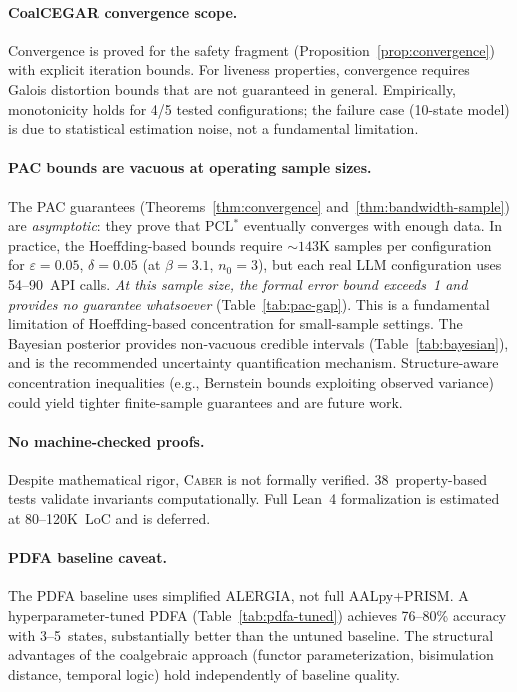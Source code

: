 \documentclass[11pt]{article}
\newcommand{\tool}{\textsc{Caber}}
\newcommand{\pclstar}{PCL$^*$}
\begin{document}
\paragraph{CoalCEGAR convergence scope.}
Convergence is proved for the safety fragment
(Proposition~\ref{prop:convergence}) with explicit iteration bounds.
For liveness properties, convergence requires Galois distortion
bounds that are not guaranteed in general.  Empirically, monotonicity
holds for 4/5 tested configurations; the failure case (10-state model)
is due to statistical estimation noise, not a fundamental limitation.

\paragraph{PAC bounds are vacuous at operating sample sizes.}
The PAC guarantees (Theorems~\ref{thm:convergence}
and~\ref{thm:bandwidth-sample}) are \emph{asymptotic}: they prove
that \pclstar{} eventually converges with enough data. In practice,
the Hoeffding-based bounds require ${\sim}143$K samples per
configuration for $\varepsilon{=}0.05$, $\delta{=}0.05$ (at
$\beta{=}3.1$, $n_0{=}3$), but each real LLM configuration uses
54--90~API calls. \emph{At this sample size, the formal error bound
exceeds~1 and provides no guarantee whatsoever}
(Table~\ref{tab:pac-gap}). This is a fundamental limitation of
Hoeffding-based concentration for small-sample settings.
The Bayesian posterior provides non-vacuous
credible intervals (Table~\ref{tab:bayesian}), and is the
recommended uncertainty quantification mechanism. Structure-aware
concentration inequalities (e.g., Bernstein bounds exploiting
observed variance) could yield tighter finite-sample guarantees
and are future work.

\paragraph{No machine-checked proofs.}
Despite mathematical rigor, \tool{} is not formally verified.
38~property-based tests validate invariants computationally.
Full Lean~4 formalization is estimated at 80--120K~LoC and is deferred.

\paragraph{PDFA baseline caveat.}
The PDFA baseline uses simplified ALERGIA, not full AALpy+PRISM.
A hyperparameter-tuned PDFA (Table~\ref{tab:pdfa-tuned}) achieves
76--80\% accuracy with 3--5~states, substantially better than the
untuned baseline.  The structural advantages of the coalgebraic
approach (functor parameterization, bisimulation distance, temporal
logic) hold independently of baseline quality.
\end{document}
